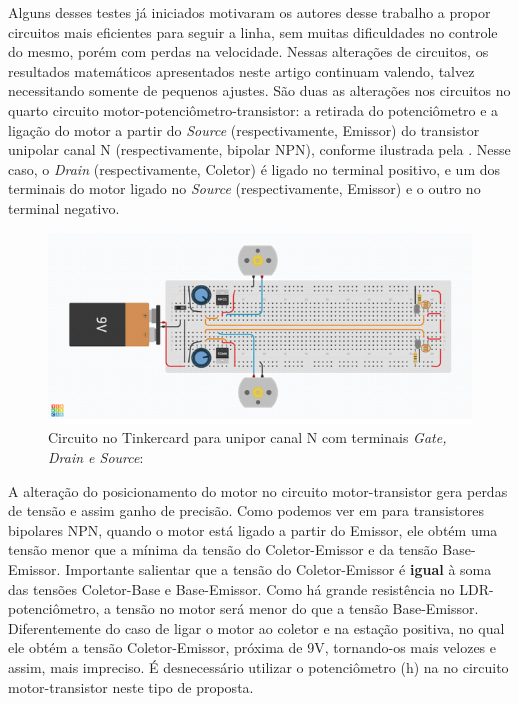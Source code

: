 \documentclass[portuguese]{textolivre}
\begin{document}
Alguns desses testes já iniciados motivaram os autores desse trabalho a propor circuitos mais eficientes para seguir a linha, sem muitas dificuldades no controle do mesmo, porém com perdas na velocidade. Nessas alterações de circuitos, os resultados matemáticos apresentados neste artigo continuam valendo, talvez necessitando somente de pequenos ajustes. São duas as alterações nos circuitos no quarto circuito motor-potenciômetro-transistor: a retirada do potenciômetro e a ligação do motor a partir do \emph{Source} (respectivamente, Emissor) do transistor unipolar canal N (respectivamente, bipolar NPN), conforme ilustrada pela . Nesse caso, o \emph{Drain} (respectivamente, Coletor) é ligado no terminal positivo, e um dos terminais do motor ligado no \emph{Source} (respectivamente, Emissor) e o outro no terminal negativo.

\begin{figure}[htbp]
\centering
\begin{minipage}{0.99\textwidth}
 \includegraphics[width=\textwidth]{figuras/figura 6.png}
 \caption{Circuito no Tinkercard para unipor canal N com terminais \emph{Gate, Drain e Source}:}
 \label{figura06}
\end{minipage}
\end{figure}

A alteração do posicionamento do motor no circuito motor-transistor gera perdas de tensão e assim ganho de precisão. Como podemos ver em \textcite{Maganha2023} para transistores bipolares NPN, quando o motor está ligado a partir do Emissor, ele obtém uma tensão menor que a mínima da tensão do Coletor-Emissor e da tensão Base-Emissor. Importante salientar que a tensão do Coletor-Emissor é \textbf{igual} à soma das tensões Coletor-Base e Base-Emissor. Como há grande resistência no LDR-potenciômetro, a tensão no motor será menor do que a tensão Base-Emissor. Diferentemente do caso de ligar o motor ao coletor e na estação positiva, no qual ele obtém a tensão Coletor-Emissor, próxima de 9V, tornando-os mais velozes e assim, mais impreciso. É desnecessário utilizar o potenciômetro (h) na  no circuito motor-transistor neste tipo de proposta.
\end{document}
